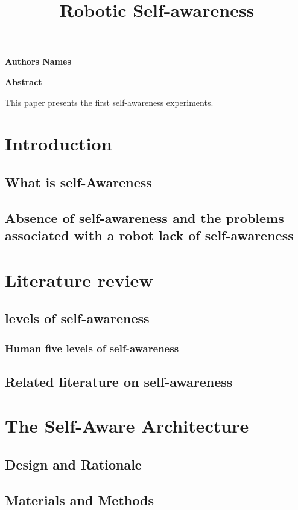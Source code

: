 \documentclass[12pt]{article}
\begin{document}
\title{Robotic Self-awareness}
\maketitle

\begin{center}
    \vspace{0.4cm}
    \textbf{Authors Names}
    
    \vspace{0.9cm}
    \textbf{Abstract}
\end{center}
This paper presents the first self-awareness experiments.

\section{Introduction}
\subsection{What is self-Awareness} 
\subsection{Absence of self-awareness and the problems associated with a robot lack of self-awareness}

\section{Literature review}
\subsection{levels of self-awareness}
\subsubsection{Human five levels of self-awareness}
\subsection{Related literature on self-awareness}

\section{The Self-Aware Architecture}
\subsection{Design and Rationale}
\subsection{Materials and Methods}
\end{document}
